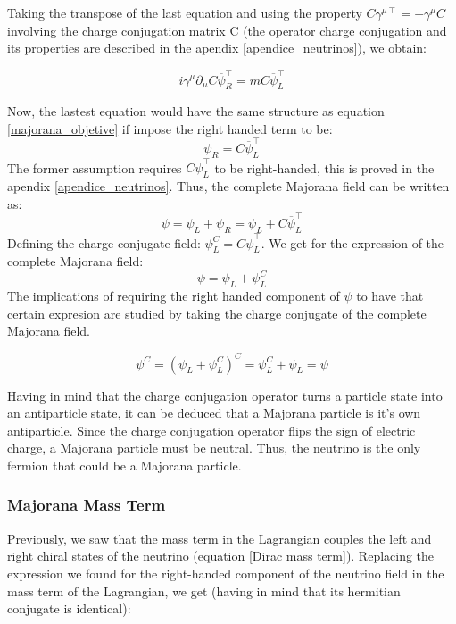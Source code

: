 Taking the transpose of the last equation and using the property $C \gamma^{\mu \intercal} = - \gamma^\mu C$ involving the charge conjugation matrix C (the operator charge conjugation and its properties are described in the apendix \ref{apendice_neutrinos}), we obtain:

\begin{equation}
i \gamma^\mu \partial_\mu C \overline{\psi}^\intercal_R = m C \overline{\psi}^{\intercal}_L
\end{equation}

Now, the lastest equation would have the same structure as equation \ref{majorana_objetive} if impose the right handed term to be:
\begin{equation}
\psi_R = C \overline{\psi}^\intercal_L
\end{equation}
The former assumption requires $C \overline{\psi}^\intercal_L$ to be right-handed, this is proved in the apendix \ref{apendice_neutrinos}. Thus, the complete Majorana field can be written as:
\begin{equation}
\psi = \psi_L + \psi_R = \psi_L + C \overline{\psi}^\intercal_L
\end{equation}
Defining the charge-conjugate field: $\psi^C_L = C \overline{\psi}^\intercal_L$. We get for the expression of the complete Majorana field:
\begin{equation}
\psi = \psi_L + \psi^C_L
\end{equation}
The implications of requiring the right handed component of $\psi$ to have that certain expresion are studied by taking the charge conjugate of the complete Majorana field. 

\begin{equation}
\psi^C = (\psi_L + \psi^C_L)^C = \psi^C_L + \psi_L = \psi
\end{equation}

Having in mind that the charge conjugation operator turns a particle state into an antiparticle state, it can be deduced that a Majorana particle is it's own antiparticle. Since the charge conjugation operator flips the sign of electric charge, a Majorana particle must be neutral. Thus, the neutrino is the only fermion that could be a Majorana particle.

\subsubsection{Majorana Mass Term}

Previously, we saw that the mass term in the Lagrangian couples the left and right chiral states of the neutrino (equation \ref{Dirac mass term}). Replacing the expression we found for the right-handed component of the neutrino field in the mass term of the Lagrangian, we get (having in mind that its hermitian conjugate is identical):

